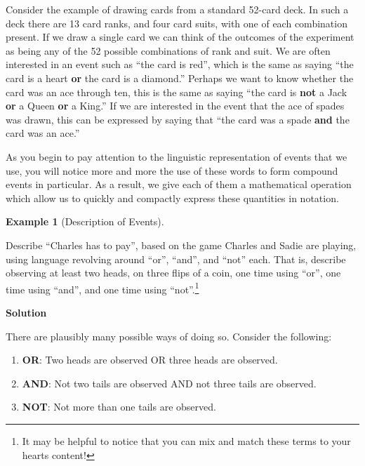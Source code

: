 \documentclass[
  letterpaper,
  DIV=11,
  numbers=noendperiod]{scrreprt}
\providecommand{\tightlist}{%
  \setlength{\itemsep}{0pt}\setlength{\parskip}{0pt}}\usepackage{longtable,booktabs,array}
\theoremstyle{definition}
\theoremstyle{definition}
\theoremstyle{definition}
\newtheorem{example}{Example}[chapter]
\theoremstyle{remark}
\begin{document}
Consider the example of drawing cards from a standard 52-card deck. In
such a deck there are 13 card ranks, and four card suits, with one of
each combination present. If we draw a single card we can think of the
outcomes of the experiment as being any of the 52 possible combinations
of rank and suit. We are often interested in an event such as ``the card
is red'', which is the same as saying ``the card is a heart \textbf{or}
the card is a diamond.'' Perhaps we want to know whether the card was an
ace through ten, this is the same as saying ``the card is \textbf{not} a
Jack \textbf{or} a Queen \textbf{or} a King.'' If we are interested in
the event that the ace of spades was drawn, this can be expressed by
saying that ``the card was a spade \textbf{and} the card was an ace.''

As you begin to pay attention to the linguistic representation of events
that we use, you will notice more and more the use of these words to
form compound events in particular. As a result, we give each of them a
mathematical operation which allow us to quickly and compactly express
these quantities in notation.

\begin{example}[Description of
Events]\protect\hypertarget{exm-linguistic-description}{}\label{exm-linguistic-description}

Describe ``Charles has to pay'', based on the game Charles and Sadie are
playing, using language revolving around ``or'', ``and'', and ``not''
each. That is, describe observing at least two heads, on three flips of
a coin, one time using ``or'', one time using ``and'', and one time
using ``not''.\footnote{It may be helpful to notice that you can mix and
  match these terms to your hearts content!}

\begin{tcolorbox}[enhanced jigsaw, colback=white, breakable, rightrule=.15mm, leftrule=.75mm, toprule=.15mm, left=2mm, arc=.35mm, opacityback=0, bottomrule=.15mm]

\vspace{-3mm}\textbf{Solution}\vspace{3mm}

There are plausibly many possible ways of doing so. Consider the
following:

\begin{enumerate}
\def\labelenumi{\arabic{enumi}.}
\tightlist
\item
  \textbf{OR}: Two heads are observed OR three heads are observed.
\item
  \textbf{AND}: Not two tails are observed AND not three tails are
  observed.
\item
  \textbf{NOT}: Not more than one tails are observed.
\end{enumerate}

\end{tcolorbox}

\end{example}
\end{document}
